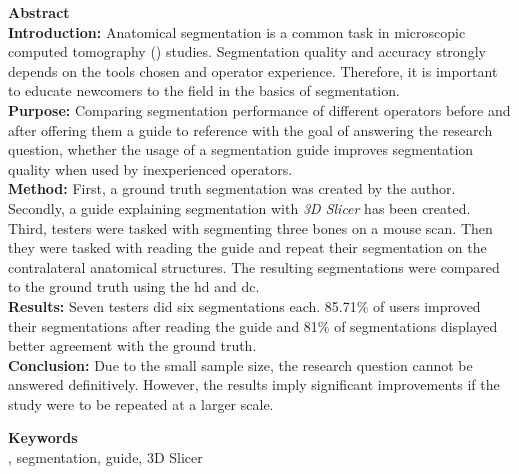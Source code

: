 
\newcommand*{\AbstractHead}[1]{%
	{\noindent\sffamily\Large\textbf{#1}}
	\vspace{10pt}\\
}%

\newcommand*{\SomeSpace}{%
	\vspace{\baselineskip}
}

\AbstractHead{Abstract}
\noindent
\normalsize
\textbf{Introduction:} Anatomical segmentation is a common task in microscopic computed tomography (\mct) studies. Segmentation quality and accuracy strongly depends on the tools chosen and operator experience. Therefore, it is important to educate newcomers to the field in the basics of \mct\space segmentation.\\
\textbf{Purpose:} Comparing segmentation performance of different operators before and after offering them a guide to reference with the goal of answering the research question, whether the usage of a segmentation guide improves segmentation quality when used by inexperienced operators.\\
\textbf{Method:} First, a ground truth segmentation was created by the author. Secondly, a guide explaining \mct\space segmentation with \textit{3D Slicer} has been created. Third, testers were tasked with segmenting three bones on a mouse \mct\space scan. Then they were tasked with reading the guide and repeat their segmentation on the contralateral anatomical structures. The resulting segmentations were compared to the ground truth using the \acrfull{hd} and \acrfull{dc}.\\
\textbf{Results:} Seven testers did six segmentations each. 85.71\% of users improved their segmentations after reading the guide and 81\% of segmentations displayed better agreement with the ground truth.\\
\textbf{Conclusion:} Due to the small sample size, the research question cannot be answered definitively. However, the results imply significant improvements if the study were to be repeated at a larger scale.\\
\SomeSpace
\newline
\noindent
\AbstractHead{Keywords}
\normalsize
\noindent
\mct, segmentation, guide, 3D Slicer

\glsresetall{}
\SomeSpace
